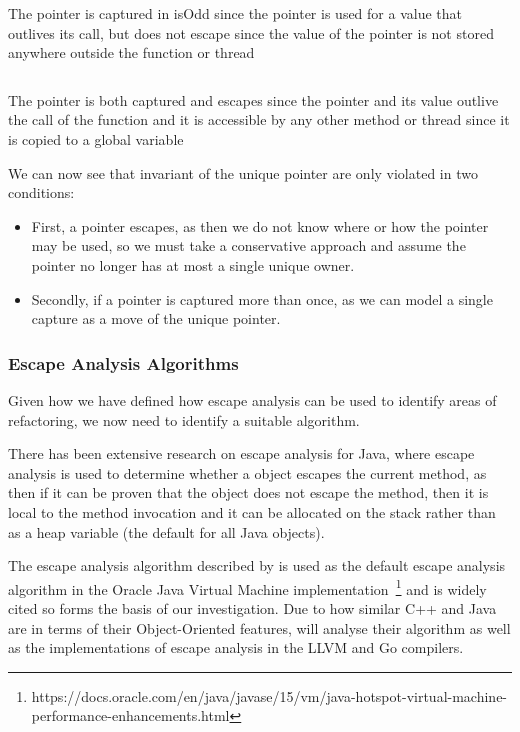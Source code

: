 \documentclass{proposal}
\begin{document}
    \begin{listing}
        \inputminted{c++}{code/capture-example.cpp}
        \caption{The pointer is captured in isOdd since the pointer is used for a value that outlives its call, but does not escape since the value of the pointer is not stored anywhere outside the function or thread}
        \label{lst:capture-example}
    \end{listing}

    \begin{listing}
        \inputminted{c++}{code/escape-example.cpp}
        \caption{The pointer is both captured and escapes since the pointer and its value outlive the call of the function and it is accessible by any other method or thread since it is copied to a global variable}
        \label{lst:escape-example}
    \end{listing}

    We can now see that invariant of the unique pointer are only violated in two conditions:
    \begin{itemize}
        \item First, a pointer escapes, as then we do not know where or how the pointer may be used, so we must take a conservative approach and assume the pointer no longer has at most a single unique owner.
        \item Secondly, if a pointer is captured more than once, as we can model a single capture as a move of the unique pointer.
    \end{itemize}

    \subsubsection{Escape Analysis Algorithms}\label{subsubsec:escape-analysis-algorithms}

    Given how we have defined how escape analysis can be used to identify areas of refactoring, we now need to identify a suitable algorithm.

    There has been extensive research on escape analysis for Java, where escape analysis is used to determine whether a object escapes the current method, as then if it can be proven that the object does not escape the method, then it is local to the method invocation and it can be allocated on the stack rather than as a heap variable (the default for all Java objects).

    The escape analysis algorithm described by \citet{Choi1999} is used as the default escape analysis algorithm in the Oracle Java Virtual Machine implementation~\footnote{https://docs.oracle.com/en/java/javase/15/vm/java-hotspot-virtual-machine-performance-enhancements.html} and is widely cited so forms the basis of our investigation.
    Due to how similar C++ and Java are in terms of their Object-Oriented features, will analyse their algorithm as well as the implementations of escape analysis in the LLVM and Go compilers.
\end{document}
